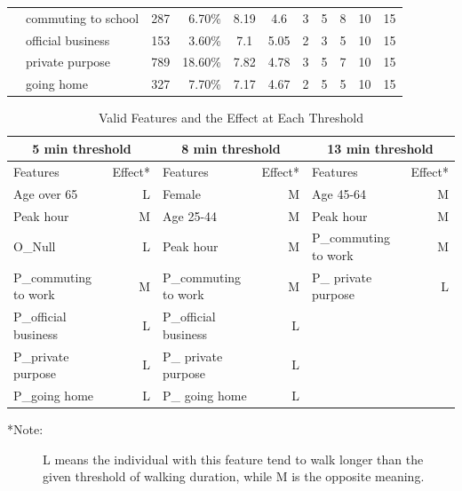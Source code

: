 \documentclass[Journal,letterpaper]{ascelike-new}
\begin{document}
\begin{table}[htbp]
\begin{tabular}{llrrccccccc}
 & commuting to school & 287   &  6.70\% & 8.19  & 4.6   & 3     & 5     & 8     & 10    & 15 \\
 & official business   & 153   &  3.60\% & 7.1   & 5.05  & 2     & 3     & 5     & 10    & 15 \\
 & private purpose     & 789   & 18.60\% & 7.82  & 4.78  & 3     & 5     & 7     & 10    & 15 \\
 & going home          & 327   &  7.70\% & 7.17  & 4.67  & 2     & 5     & 5     & 10    & 15 \\
%
        \hline\hline
    \end{tabular}
    \normalsize
\end{table}

%
\begin{table}[htbp]
    \caption{Valid Features and the Effect at Each Threshold}
    \label{table:ValidFeatures}
    \centering
    \begin{tabular}{lrlrlr}
    \hline\hline
    \multicolumn{2}{c}{5 min threshold} & \multicolumn{2}{c}{8 min threshold} & \multicolumn{2}{c}{13 min threshold} \\
    \hline
Features 	& Effect* 	& Features 	& Effect*		& Features 	& Effect* \\
Age over 65 			& L	& Female				& M	& Age 45-64				& M	\\
Peak hour				& M	& Age 25-44 			& M	& Peak hour 			& M	\\
O\_Null					& L	& Peak hour				& M	& P\_commuting to work 	& M \\
P\_commuting to work	& M	& P\_commuting to work  & M	& P\_ private purpose 	& L \\
P\_official business	& L & P\_official business	& L	&       				&  	\\
P\_private purpose		& L & P\_ private purpose	& L &       				&  	\\
P\_going home 			& L & P\_ going home 		& L &       				&   \\
    \hline\hline
    \end{tabular}
    \normalsize
%
    \begin{description}
        \item[*Note:] L means the individual with this feature tend to walk longer than the given threshold of walking duration, while M is the opposite meaning.
    \end{description}
\end{table}
\end{document}

